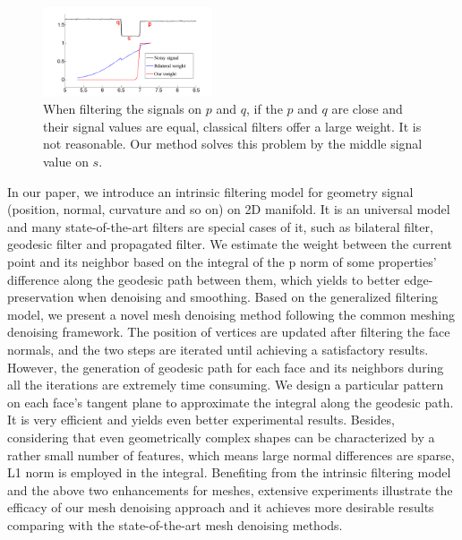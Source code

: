 \begin{figure}
\centering
\includegraphics[width = 5.0cm]{results/Relation/weight2.png}
\vspace{-0.5mm}
\caption{ When filtering the signals on $p$ and $q$, if the $p$ and $q$ are close and their signal values are equal, classical filters offer a large weight.
It is not reasonable. Our method solves this problem by the middle signal value on $s$. }
\label{Fig:relation}
\end{figure}

In our paper, we introduce an intrinsic filtering model for geometry signal (position, normal, curvature and so on) on 2D manifold.
It is an universal model and many state-of-the-art filters are special cases of it, such as bilateral filter, geodesic filter and propagated filter.
We estimate the weight between the current point and its neighbor based on the integral of the p norm of some properties' difference along the geodesic path between them,
which yields to better edge-preservation when denoising and smoothing.
Based on the generalized filtering model, we present a novel mesh denoising method following the common meshing denoising framework.
The position of vertices are updated after filtering the face normals, and the two steps are iterated until achieving a satisfactory results.
However, the generation of geodesic path for each face and its neighbors during all the iterations are extremely time consuming. We design a particular pattern on each face's tangent plane to approximate the integral along the geodesic path. It is very efficient and yields even better experimental results.
Besides, considering that even geometrically complex shapes can be characterized by a rather small number of features, which means large normal differences are sparse, L1 norm is employed in the integral.
Benefiting from the intrinsic filtering model and the above two enhancements for meshes, extensive experiments illustrate the efficacy of our mesh denoising approach and it achieves more desirable results comparing with the state-of-the-art mesh denoising methods.
